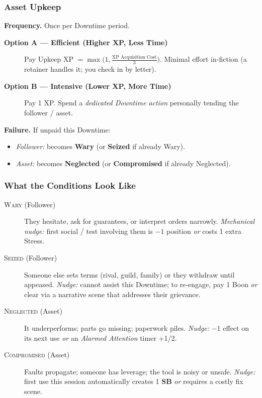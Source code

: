 \subsubsection{Asset Upkeep}\label{subsec:upkeep_core}
\textbf{Frequency.} Once per Downtime period.

\begin{description}
    \item[\textbf{Option A --- Efficient (Higher XP, Less Time)}] Pay Upkeep XP \(= \max\bigl(1, \frac{\text{XP Acquisition Cost}}{3}\bigr)\). Minimal effort in‑fiction (a retainer handles it; you check in by letter).
    \item[\textbf{Option B --- Intensive (Lower XP, More Time)}] Pay 1 XP. Spend a \emph{dedicated Downtime action} personally tending the follower / asset.
\end{description}

\textbf{Failure.} If unpaid this Downtime:
\begin{itemize}
    \item \emph{Follower:} becomes \textbf{Wary} (or \textbf{Seized} if already Wary).
    \item \emph{Asset:} becomes \textbf{Neglected} (or \textbf{Compromised} if already Neglected).
\end{itemize}

\subsubsection{What the Conditions Look Like}\label{subsec:upkeep_conditions}
\begin{description}
    \item[\textsc{Wary} (Follower)] They hesitate, ask for guarantees, or interpret orders narrowly. \emph{Mechanical nudge:} first social / test involving them is \(-1\) position \emph{or} costs 1 extra Stress.
    \item[\textsc{Seized} (Follower)] Someone else sets terms (rival, guild, family) or they withdraw until appeased. \emph{Nudge:} cannot assist this Downtime; to re‑engage, pay 1 Boon \emph{or} clear via a narrative scene that addresses their grievance.
    \item[\textsc{Neglected} (Asset)] It underperforms; parts go missing; paperwork piles. \emph{Nudge:} \(-1\) effect on its next use \emph{or} an \emph{Alarmed Attention} timer +1/2.
    \item[\textsc{Compromised} (Asset)] Faults propagate; someone has leverage; the tool is noisy or unsafe. \emph{Nudge:} first use this session automatically creates 1 \textbf{SB} \emph{or} requires a costly fix scene.
\end{description}

